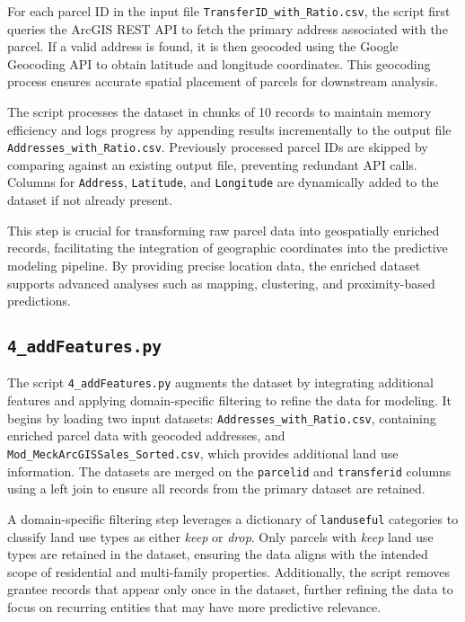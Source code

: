 For each parcel ID in the input file \texttt{TransferID\_with\_Ratio.csv}, the script first queries the ArcGIS REST API to fetch the primary address associated with the parcel. If a valid address is found, it is then geocoded using the Google Geocoding API to obtain latitude and longitude coordinates. This geocoding process ensures accurate spatial placement of parcels for downstream analysis.

The script processes the dataset in chunks of 10 records to maintain memory efficiency and logs progress by appending results incrementally to the output file \texttt{Addresses\_with\_Ratio.csv}. Previously processed parcel IDs are skipped by comparing against an existing output file, preventing redundant API calls. Columns for \texttt{Address}, \texttt{Latitude}, and \texttt{Longitude} are dynamically added to the dataset if not already present.

This step is crucial for transforming raw parcel data into geospatially enriched records, facilitating the integration of geographic coordinates into the predictive modeling pipeline. By providing precise location data, the enriched dataset supports advanced analyses such as mapping, clustering, and proximity-based predictions.

\subsection{\texttt{4\_addFeatures.py}}

The script \texttt{4\_addFeatures.py} augments the dataset by integrating additional features and applying domain-specific filtering to refine the data for modeling. It begins by loading two input datasets: \texttt{Addresses\_with\_Ratio.csv}, containing enriched parcel data with geocoded addresses, and \texttt{Mod\_MeckArcGISSales\_Sorted.csv}, which provides additional land use information. The datasets are merged on the \texttt{parcelid} and \texttt{transferid} columns using a left join to ensure all records from the primary dataset are retained.

A domain-specific filtering step leverages a dictionary of \texttt{landuseful} categories to classify land use types as either \textit{keep} or \textit{drop}. Only parcels with \textit{keep} land use types are retained in the dataset, ensuring the data aligns with the intended scope of residential and multi-family properties. Additionally, the script removes grantee records that appear only once in the dataset, further refining the data to focus on recurring entities that may have more predictive relevance.

